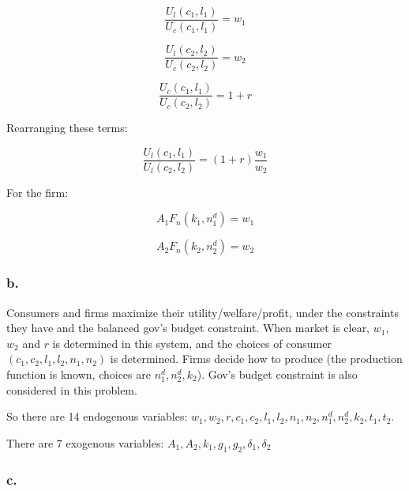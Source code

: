 \documentclass{article}
\begin{document}
\begin{equation*}
    \dfrac{U_{l}\left(c_{1}, l_{1}\right)}{U_{c}\left(c_{1}, l_{1}\right)}=w_{1} 
\end{equation*}

\begin{equation*}
    \dfrac{U_{l}\left(c_{2}, l_{2}\right)}{U_{c}\left(c_{2}, l_{2}\right)}=w_{2} 
\end{equation*}

\begin{equation*}
    \dfrac{U_{c}\left(c_{1}, l_{1}\right)}{U_{c}\left(c_{2}, l_{2}\right)}=1+r 
\end{equation*}

Rearranging these terms:

\begin{equation*}
    \dfrac{U_{l}\left(c_{1}, l_{1}\right)}{U_{l}\left(c_{2}, l_{2}\right)}=\left(1+r\right)\dfrac{w_{1}}{w_{2}} 
\end{equation*}

For the firm:

\begin{equation*}
    A_{1}F_{n}\left(k_{1}, n^{d}_{1}\right)=w_{1}
\end{equation*}

\begin{equation*}
    A_{2}F_{n}\left(k_{2}, n^{d}_{2}\right)=w_{2}
\end{equation*}

\subsubsection*{\textrm{b.}}

Consumers and firms maximize their utility/welfare/profit, under the constraints they have and the balanced gov's budget constraint. When market is clear, $w_{1}$, $w_{2}$ and $r$ is determined in this system, and the choices of consumer $\left(c_{1}, c_{2}, l_{1}, l_{2}, n_{1}, n_{2}\right)$ is determined. Firms decide how to produce (the production function is known, choices are $n^{d}_{1}, n^{d}_{2}, k_{2}$). Gov's budget constraint is also considered in this problem. 

So there are 14 endogenous variables: $w_{1}, w_{2}, r, c_{1}, c_{2}, l_{1}, l_{2}, n_{1}, n_{2}, n^{d}_{1}, n^{d}_{2}, k_{2}, t_{1}, t_{2}$.

There are 7 exogenous variables: $A_{1}, A_{2}, k_{1}, g_{1}, g_{2}, \delta_{1}, \delta_{2}$

\subsubsection*{\textrm{c.}}
\end{document}
